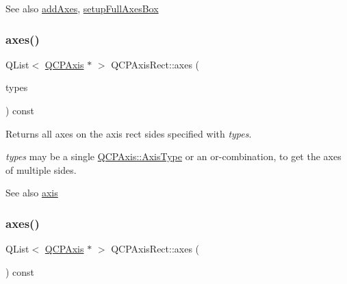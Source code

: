 \begin{DoxySeeAlso}{See also}
\hyperlink{class_q_c_p_axis_rect_a792e1f3d9cb1591fca135bb0de9b81fc}{add\+Axes}, \hyperlink{class_q_c_p_axis_rect_a5fa906175447b14206954f77fc7f1ef4}{setup\+Full\+Axes\+Box} 
\end{DoxySeeAlso}
\mbox{\label{class_q_c_p_axis_rect_a8db4722cb93e9c4a6f0d91150c200867}} 
\subsubsection{\texorpdfstring{axes()}{axes()}\hspace{0.1cm}{\footnotesize\ttfamily [1/2]}}
{\footnotesize\ttfamily Q\+List$<$ \hyperlink{class_q_c_p_axis}{Q\+C\+P\+Axis} $\ast$ $>$ Q\+C\+P\+Axis\+Rect\+::axes (\begin{DoxyParamCaption}\item[{Q\+C\+P\+Axis\+::\+Axis\+Types}]{types }\end{DoxyParamCaption}) const}

Returns all axes on the axis rect sides specified with {\itshape types}.

{\itshape types} may be a single \hyperlink{class_q_c_p_axis_ae2bcc1728b382f10f064612b368bc18a}{Q\+C\+P\+Axis\+::\+Axis\+Type} or an {\ttfamily or}-\/combination, to get the axes of multiple sides.

\begin{DoxySeeAlso}{See also}
\hyperlink{class_q_c_p_axis_rect_a583ae4f6d78b601b732183f6cabecbe1}{axis} 
\end{DoxySeeAlso}
\mbox{\label{class_q_c_p_axis_rect_a11657b8faebe9677180860e8057ede26}} 
\subsubsection{\texorpdfstring{axes()}{axes()}\hspace{0.1cm}{\footnotesize\ttfamily [2/2]}}
{\footnotesize\ttfamily Q\+List$<$ \hyperlink{class_q_c_p_axis}{Q\+C\+P\+Axis} $\ast$ $>$ Q\+C\+P\+Axis\+Rect\+::axes (\begin{DoxyParamCaption}{ }\end{DoxyParamCaption}) const}

